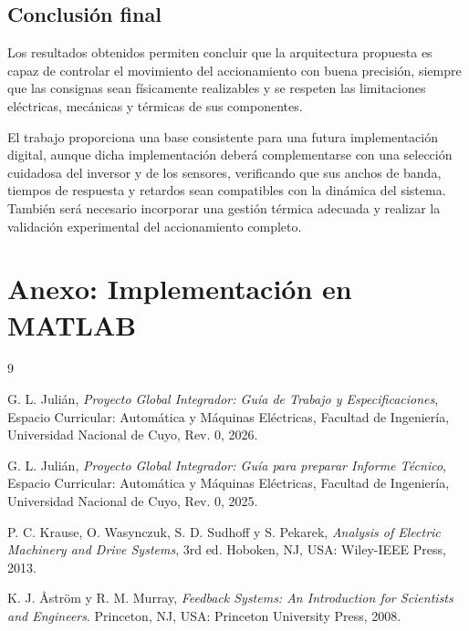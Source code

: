 \documentclass[10pt,a4paper]{article}
\begin{document}
\subsection{Conclusión final}

Los resultados obtenidos permiten concluir que la arquitectura propuesta es
capaz de controlar el movimiento del accionamiento con buena precisión, siempre
que las consignas sean físicamente realizables y se respeten las limitaciones
eléctricas, mecánicas y térmicas de sus componentes.

El trabajo proporciona una base consistente para una futura implementación
digital, aunque dicha implementación deberá complementarse con una selección
cuidadosa del inversor y de los sensores, verificando que sus anchos de banda,
tiempos de respuesta y retardos sean compatibles con la dinámica del sistema.
También será necesario incorporar una gestión térmica adecuada y realizar la
validación experimental del accionamiento completo.

\section{Anexo: Implementación en MATLAB}



\begin{thebibliography}{9}
	
	G. L. Julián, \textit{Proyecto Global Integrador: Guía de Trabajo y Especificaciones}, Espacio Curricular: Automática y Máquinas Eléctricas, Facultad de Ingeniería, Universidad Nacional de Cuyo, Rev. 0, 2026.
	
	G. L. Julián, \textit{Proyecto Global Integrador: Guía para preparar Informe Técnico}, Espacio Curricular: Automática y Máquinas Eléctricas, Facultad de Ingeniería, Universidad Nacional de Cuyo, Rev. 0, 2025.
	
	P. C. Krause, O. Wasynczuk, S. D. Sudhoff y S. Pekarek, \textit{Analysis of Electric Machinery and Drive Systems}, 3rd ed. Hoboken, NJ, USA: Wiley-IEEE Press, 2013.
	
	K. J. Åström y R. M. Murray, \textit{Feedback Systems: An Introduction for Scientists and Engineers}. Princeton, NJ, USA: Princeton University Press, 2008.
	
\end{thebibliography}
\end{document}
